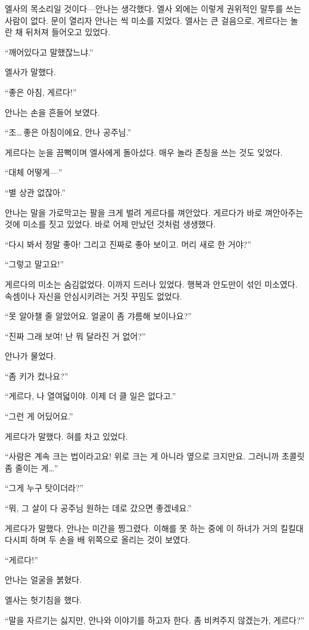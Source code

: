 엘사의 목소리일 것이다—안나는 생각했다. 엘사 외에는 이렇게 권위적인 말투를 쓰는 사람이 없다. 문이 열리자 안나는 씩 미소를 지었다. 엘사는 큰 걸음으로, 게르다는 놀란 채 뒤처져 들어오고 있었다.

``깨어있다고 말했잖느냐.''

엘사가 말했다.

``좋은 아침, 게르다!''

안나는 손을 흔들어 보였다.

``조\ldots\,좋은 아침이에요, 안나 공주님.''

게르다는 눈을 끔뻑이며 엘사에게 돌아섰다. 매우 놀라 존칭을 쓰는 것도 잊었다.

``대체 어떻게—''

``별 상관 없잖아.''

안나는 말을 가로막고는 팔을 크게 벌려 게르다를 껴안았다. 게르다가 바로 껴안아주는 것에 미소를 짓고 있었다. 바로 어제 만났던 것처럼 생생했다.

``다시 봐서 정말 좋아! 그리고 진짜로 좋아 보이고. 머리 새로 한 거야?''

``그렇고 말고요!''

게르다의 미소는 숨김없었다. 이까지 드러나 있었다. 행복과 안도만이 섞인 미소였다. 속셈이나 자신을 안심시키려는 거짓 꾸밈도 없었다.

``못 알아챌 줄 알았어요. 얼굴이 좀 갸름해 보이나요?''

``진짜 그래 보여! 난 뭐 달라진 거 없어?''

안나가 물었다.

``좀 키가 컸나요?''

``게르다, 나 열여덟이야. 이제 더 클 일은 없다고.''

``그런 게 어딨어요.''

게르다가 말했다. 혀를 차고 있었다.

``사람은 계속 크는 법이라고요! 위로 크는 게 아니라 옆으로 크지만요. 그러니까 초콜릿 좀 줄이는 게\ldots''

``그게 누구 탓이더라?''

``뭐, 그 살이 다 공주님 원하는 데로 갔으면 좋겠네요.''

게르다가 말했다. 안나는 미간을 찡그렸다. 이해를 못 하는 중에 이 하녀가 거의 킬킬대다시피 하며 두 손을 배 위쪽으로 올리는 것이 보였다.

``게르다!''

안나는 얼굴을 붉혔다.

엘사는 헛기침을 했다.

``말을 자르기는 싫지만, 안나와 이야기를 하고자 한다. 좀 비켜주지 않겠는가, 게르다?''

